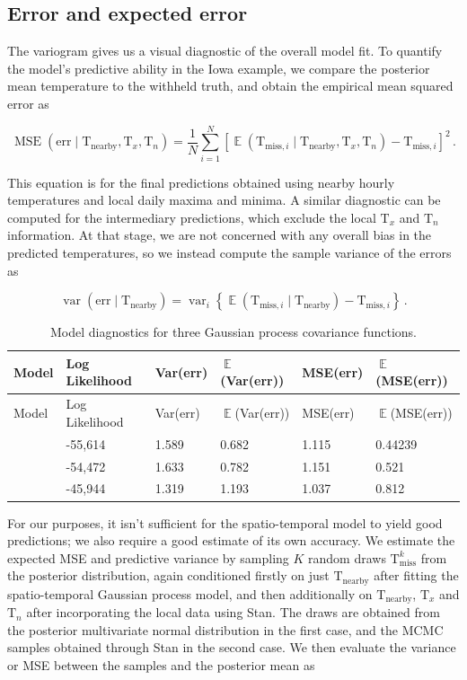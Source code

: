 \documentclass[letter]{article}
\newcommand{\genericdel}[3]{%
      \left#1#3\right#2
    }
\newcommand{\del}[1]{\genericdel(){#1}}
\newcommand{\sbr}[1]{\genericdel[]{#1}}
\newcommand{\cbr}[1]{\genericdel\{\}{#1}}
\DeclareMathOperator{\E}{\mathbb{E}}
\DeclareMathOperator{\var}{{var}}
\DeclareMathOperator{\mse}{{MSE}}
\newcommand{\T}{\mathrm{T}}
\newcommand{\Tn}{\T_{n}}
\newcommand{\Tx}{\T_{x}}
\newcommand{\miss}{\mathrm{miss}}
\newcommand{\obs}{\mathrm{nearby}}
\newcommand{\error}{\mathrm{err}}
\DeclareMathOperator{\kSESE}{k_{\mathtt{SExSE}}}
\DeclareMathOperator{\kdiurn}{k_{\mathtt{SESE_{24}}}}
\DeclareMathOperator{\ksumprod}{k_{\mathtt{sumprod}}}
\newcommand{\eqlabel}[1]{\label{#1}}
\begin{document}
        \subsection{Error and expected error}\label{error-and-expected-error}

The variogram gives us a visual diagnostic of the overall model fit. To quantify the model's predictive ability in the Iowa example, we compare the posterior mean temperature to the withheld truth, and obtain the empirical mean squared error as

\begin{equation}
    \label{eq:mse}
    \mse\del{\error \mid \T_\obs,\Tx,\Tn} = \frac{1}{N} \sum_{i=1}^N \sbr{\E\del{\T_{\miss,i} \mid \T_\obs,\Tx,\Tn} - \T_{\miss,i}}^2\,.
\end{equation}

This equation is for the final predictions obtained using nearby hourly temperatures and local daily maxima and minima.
A similar diagnostic can be computed for the intermediary predictions, which exclude the local \(\Tx\) and \(\Tn\) information.
At that stage, we are not concerned with any overall bias in the predicted temperatures, so we instead compute the sample variance of the errors as

\begin{equation}
    \eqlabel{eq:varerr}
    \var\del{\error \mid \T_\obs} = \var_i \cbr{\E\del{\T_{\miss,i} \mid \T_\obs} - \T_{\miss,i}}\,.
\end{equation}
    


        \begin{longtable}[]{@{}llllll@{}}
\caption{Model diagnostics for three Gaussian process covariance functions. \label{table:diagnostics}}\tabularnewline
\toprule
Model & Log Likelihood & Var(err) & \(\E\)(Var(err)) & MSE(err) & \(\E\)(MSE(err))\tabularnewline
\midrule
\endfirsthead
\toprule
Model & Log Likelihood & Var(err) & \(\E\)(Var(err)) & MSE(err) & \(\E\)(MSE(err))\tabularnewline
\midrule
\endhead
\(\kSESE\) & -55,614 & 1.589 & 0.682 & 1.115 & 0.44239\tabularnewline
\(\kdiurn\) & -54,472 & 1.633 & 0.782 & 1.151 & 0.521\tabularnewline
\(\ksumprod\) & -45,944 & 1.319 & 1.193 & 1.037 & 0.812\tabularnewline
\bottomrule
\end{longtable}
    


        For our purposes, it isn't sufficient for the spatio-temporal model to yield good predictions; we also require a good estimate of its own accuracy.
We estimate the expected MSE and predictive variance by sampling \(K\) random draws \(\T^k_\miss\) from the posterior distribution, again conditioned firstly on just \(\T_\obs\) after fitting the spatio-temporal Gaussian process model, and then additionally on \(\T_\obs\), \(\Tx\) and \(\Tn\) after incorporating the local data using Stan.
The draws are obtained from the posterior multivariate normal distribution in the first case, and the MCMC samples obtained through Stan in the second case.
We then evaluate the variance or MSE between the samples and the posterior mean as
\end{document}
